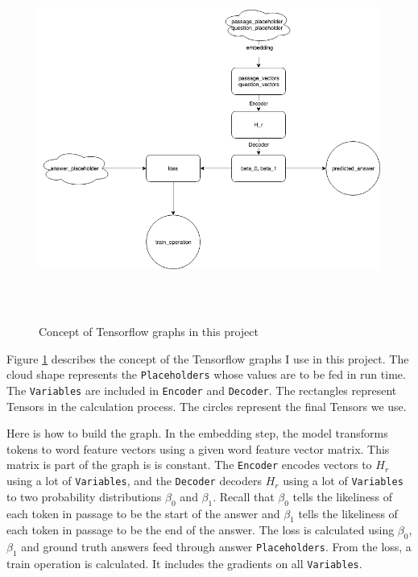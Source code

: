 \documentclass[modernstyle,12pt]{sjsuthesis}
\theoremstyle{definition}
\begin{document}
\begin{figure}[htbp]\centering
  \includegraphics[width=12cm, height=12cm]{figures/tf_graph.png}
  \caption{Concept of Tensorflow graphs in this project}
  \label{f:tf_graph}
\end{figure}

Figure \ref{f:tf_graph} describes the concept of the Tensorflow graphs I use in this project. The cloud shape represents the {\tt Placeholders} whose values are to be fed in run time. The {\tt Variables} are included in {\tt Encoder} and {\tt Decoder}. The rectangles represent Tensors in the calculation process. The circles represent the final Tensors we use.

Here is how to build the graph. In the embedding step, the model transforms tokens to word feature vectors using a given word feature vector matrix. This matrix is part of the graph is is constant. The {\tt Encoder} encodes vectors to $H_r$ using a lot of {\tt Variables}, and the {\tt Decoder} decoders $H_r$ using a lot of {\tt Variables} to two probability distributions $\beta _0$ and $\beta _1$. Recall that $\beta _0$ tells the likeliness of each token in passage to be the start of the answer and $\beta _1$ tells the likeliness of each token in passage to be the end of the answer. The loss is calculated using $\beta _0$, $\beta _1$ and ground truth answers feed through answer {\tt Placeholders}. From the loss, a train operation is calculated. It includes the gradients on all {\tt Variables}.
\end{document}
